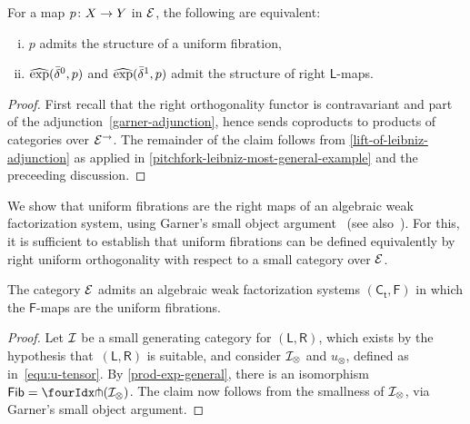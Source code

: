 \documentclass[reqno,10pt,a4paper,oneside,draft]{amsart}
\newcommand{\LL}{\mathsf{L}}
\newcommand{\RR}{\mathsf{R}}
\begin{document}
{{\begin{proposition} \label{prod-exp-general}
For a map $p \co X \to Y$ in $\catE$, the following are equivalent:
\begin{enumerate}[(i)]
\item $p$ admits the structure of a uniform fibration,
\item $\hatexp(\bar{\delta}^0, p)$ and $\hatexp(\bar{\delta}^1, p)$ admit the structure of right $\LL$-maps.
\end{enumerate}
\end{proposition}

\begin{proof}
First recall that the right orthogonality functor is contravariant and part of the adjunction~\eqref{garner-adjunction}, hence sends coproducts to products of categories over $\catE^\to$.
The remainder of the claim follows from \cref{lift-of-leibniz-adjunction} as applied in \cref{pitchfork-leibniz-most-general-example} and the preceeding discussion.
\end{proof}



We show that uniform fibrations are the right maps of an algebraic weak factorization system, using Garner's small object argument~\cite{garner:small-object-argument} (see also~\cite[Proposition~16]{bourke-garner-I}). For this, it is sufficient to establish
that uniform fibrations can be defined equivalently by right uniform orthogonality with respect to a small category over $\catE$.









\begin{theorem} \label{thm:sset-cset-nwfs} The category $\cal{E}$ admits an algebraic weak factorization systems $(\mathsf{C_t}, \mathsf{F})$ in which the $\mathsf{F}$-maps are the uniform fibrations. 
\end{theorem}

\begin{proof} Let $\cal{I}$ be a small generating category for $(\LL, \RR)$, which exists by the hypothesis
that~$(\LL, \RR)$ is suitable, and consider $\cal{I}_\otimes$ and $u_\otimes$, defined as in~\eqref{equ:u-tensor}.
By \cref{prod-exp-general}, there is an isomorphism $\Fib{}  = \liftr{(\cal{I}_\otimes)}$. The claim now follows 
from the smallness of  $\cal{I}_\otimes$, via Garner's small object argument.
\end{proof}





}}
\end{document}
